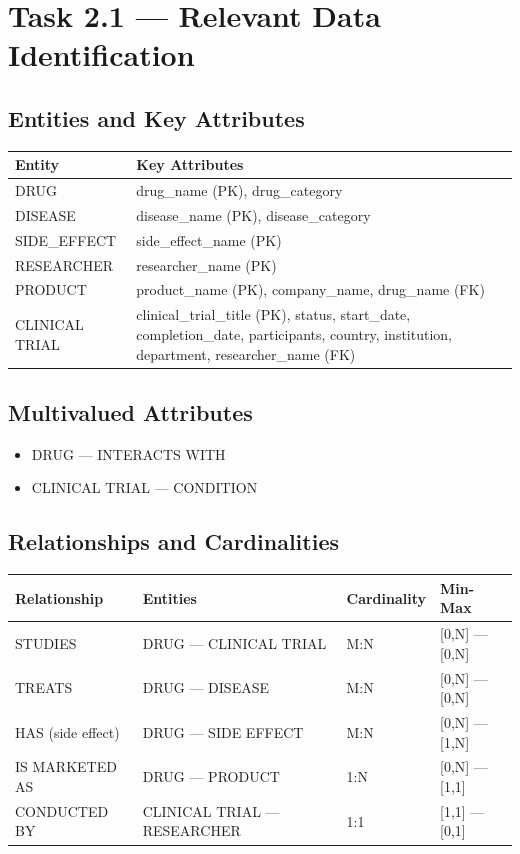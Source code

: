 \documentclass[15pt,a4paper]{article}
\begin{document}
\section{ Task 2.1 — Relevant Data Identification}

\subsection{Entities and Key Attributes}

\begin{longtable}{|p{}|p{}|}
\hline
\textbf{Entity} & \textbf{Key Attributes}  \\
\hline
DRUG & drug\_name (PK), drug\_category  \\
\hline
DISEASE & disease\_name (PK), disease\_category  \\
\hline
SIDE\_EFFECT & side\_effect\_name (PK) \\
\hline
RESEARCHER & researcher\_name (PK) \\
\hline
PRODUCT & product\_name (PK), company\_name, drug\_name (FK) \\
\hline
CLINICAL TRIAL & clinical\_trial\_title (PK), status, start\_date, completion\_date, participants, country, institution, department, researcher\_name (FK) \\
\hline
\end{longtable}

\subsection{Multivalued Attributes}

\begin{itemize}
    \item DRUG — INTERACTS WITH
    \item CLINICAL TRIAL — CONDITION
\end{itemize}

\subsection{Relationships and Cardinalities}

\begin{longtable}{|p{4cm}|p{4cm}|p{4cm}|p{2cm}|}
\hline
\textbf{Relationship} & \textbf{Entities} & \textbf{Cardinality} & \textbf{Min-Max} \\
\hline
STUDIES & DRUG — CLINICAL TRIAL & M:N & [0,N] — [0,N]\\
\hline
TREATS & DRUG — DISEASE & M:N &[0,N] — [0,N]\\
\hline
HAS (side effect) & DRUG — SIDE EFFECT & M:N &[0,N] — [1,N] \\
\hline
IS MARKETED AS & DRUG — PRODUCT & 1:N & [0,N] — [1,1]\\
\hline
CONDUCTED BY & CLINICAL TRIAL — RESEARCHER & 1:1 & [1,1] — [0,1]
 \\
\hline

\end{longtable}
\end{document}
